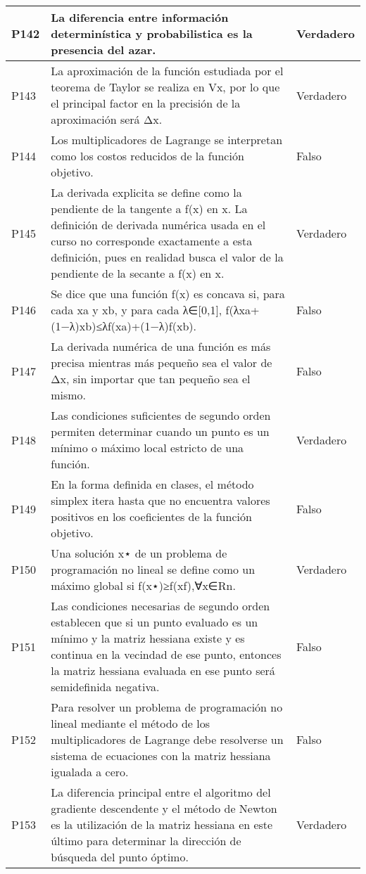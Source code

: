 \documentclass{article}
\begin{document}
\begin{longtable}{|>{\centering\arraybackslash}p{1.5cm}|>{\raggedright\arraybackslash}p{14cm}|>{\centering\arraybackslash}p{2cm}|}
\hline
P142 & La diferencia entre información determinística y probabilistica es la presencia del azar. & Verdadero \\
\hline
P143 & La aproximación de la función estudiada por el teorema de Taylor se realiza en Vx, por lo que el principal factor en la precisión de la aproximación será Δx. & Verdadero \\
\hline
P144 & Los multiplicadores de Lagrange se interpretan como los costos reducidos de la función objetivo. & Falso \\
\hline
P145 & La derivada explicita se define como la pendiente de la tangente a f(x) en x. La definición de derivada numérica usada en el curso no corresponde exactamente a esta definición, pues en realidad busca el valor de la pendiente de la secante a f(x) en x. & Verdadero \\
\hline
P146 & Se dice que una función f(x) es concava si, para cada xa y xb, y para cada λ∈[0,1], f(λxa+(1−λ)xb)≤λf(xa)+(1−λ)f(xb). & Falso \\
\hline
P147 & La derivada numérica de una función es más precisa mientras más pequeño sea el valor de Δx, sin importar que tan pequeño sea el mismo. & Falso \\
\hline
P148 & Las condiciones suficientes de segundo orden permiten determinar cuando un punto es un mínimo o máximo local estricto de una función. & Verdadero \\
\hline
P149 & En la forma definida en clases, el método simplex itera hasta que no encuentra valores positivos en los coeficientes de la función objetivo. & Falso \\
\hline
P150 & Una solución x⋆ de un problema de programación no lineal se define como un máximo global si f(x⋆)≥f(xf),∀x∈Rn. & Verdadero \\
\hline
P151 & Las condiciones necesarias de segundo orden establecen que si un punto evaluado es un mínimo y la matriz hessiana existe y es continua en la vecindad de ese punto, entonces la matriz hessiana evaluada en ese punto será semidefinida negativa. & Falso \\
\hline
P152 & Para resolver un problema de programación no lineal mediante el método de los multiplicadores de Lagrange debe resolverse un sistema de ecuaciones con la matriz hessiana igualada a cero. & Falso \\
\hline
P153 & La diferencia principal entre el algoritmo del gradiente descendente y el método de Newton es la utilización de la matriz hessiana en este último para determinar la dirección de búsqueda del punto óptimo. & Verdadero \\

\end{longtable}
\end{document}
